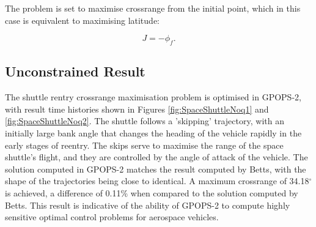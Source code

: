 The problem is set to maximise crossrange from the initial point, which in this case is equivalent to maximising latitude:

\begin{equation}
J = -\phi_f.
\end{equation}

\subsection{Unconstrained Result}
The shuttle rentry crossrange maximisation problem is optimised in GPOPS-2, with result time histories shown in Figures \ref{fig:SpaceShuttleNoq1} and \ref{fig:SpaceShuttleNoq2}. The shuttle follows a 'skipping' trajectory, with an initially large bank angle that changes the heading of the vehicle rapidly in the early stages of reentry. The skips serve to maximise the range of the space shuttle's flight, and they are controlled by the angle of attack of the vehicle. The solution computed in GPOPS-2 matches the result computed by Betts\cite{Betts2009}, with the shape of the trajectories being close to identical. A maximum crossrange of 34.18$^\circ$ is achieved, a difference of 0.11\% when compared to the solution computed by Betts\cite{Betts2009}. This result is indicative of the ability of GPOPS-2 to compute highly sensitive optimal control problems for aerospace vehicles. 


